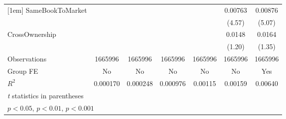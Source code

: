 {\begin{tabular}{l*{6}{c}}
[1em]
SameBookToMarket&                  &                  &                  &                  &  0.00763\sym{***}&  0.00876\sym{***}\\
                &                  &                  &                  &                  &   (4.57)         &   (5.07)         \\
[1em]
CrossOwnership  &                  &                  &                  &                  &   0.0148         &   0.0164         \\
                &                  &                  &                  &                  &   (1.20)         &   (1.35)         \\
\hline
Observations    &  1665996         &  1665996         &  1665996         &  1665996         &  1665996         &  1665996         \\
Group FE        &       No         &       No         &       No         &       No         &       No         &      Yes         \\
$ R^2 $         & 0.000170         & 0.000248         & 0.000976         &  0.00115         &  0.00159         &  0.00640         \\
\hline\hline
\multicolumn{7}{l}{\footnotesize \textit{t} statistics in parentheses}\\
\multicolumn{7}{l}{\footnotesize \sym{*} \(p<0.05\), \sym{**} \(p<0.01\), \sym{***} \(p<0.001\)}\\
\end{tabular}
}
